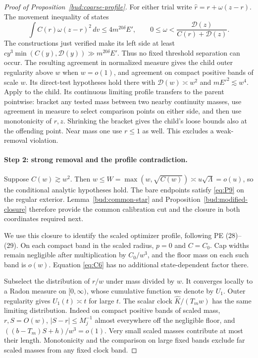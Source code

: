 \begin{proof}[Proof of Proposition~\ref{bud:coarse-profile}]
For either trial write \(\widehat r=r+\omega(z-r)\). The movement
inequality of \cite[Lemma~6.3]{PE} states
\[
 \int C(r)\omega(z-r)^2\,dv\le4m^{20\delta}E',
 \qquad 0\le\omega<\frac{\mathcal D(z)}{C(r)+\mathcal D(z)}.
\]
The constructions just verified make its left side at least
\(c y^3\min(C(y),\mathcal D(y))\gg m^{20\delta}E'\).
Thus no fixed threshold separation can occur. The resulting agreement
in normalized measure gives the child outer regularity above \(w\)
when \(w=o(1)\), and agreement on compact positive bands of scale
\(w\). Its direct-test hypotheses hold there with
\(\mathcal D(w)\asymp w^2\) and \(mE'^2\lesssim w^4\).
Apply \cite[Theorem~5.1 and Proposition~5.9]{PE} to the child.
Its continuous limiting profile transfers to the parent pointwise:
bracket any tested mass between two nearby continuity masses, use
agreement in measure to select comparison points on either side,
and then use monotonicity of \(r,z\). Shrinking the bracket gives
the child's loose bounds also at the offending point. Near mass one
use \(r\le1\) as well. This excludes a weak-removal violation.




\paragraph{Step 2: strong removal and the profile contradiction.}

Suppose $C(w)\gtrsim w^2$. Then
$w\le W=\max(w,\sqrt{C(w)})\asymp u\sqrt\Lambda=o(u)$,
so the conditional analytic hypotheses hold. The bare endpoints satisfy
\eqref{eq:P9} on the regular exterior. Lemma~\ref{bud:common-star} and
Proposition~\ref{bud:modified-closure} therefore provide the common
calibration cut and the closure in both coordinates required next.

We use this closure to identify the scaled optimizer profile,
following PE (28)--(29). On each compact band in the scaled radius,
\(p=0\) and \(C=C_0\). Cap widths remain negligible after
multiplication by \(C_0/w^3\), and the floor mass on each such band
is \(o(w)\). Equation \eqref{eq:C6} has no additional
state-dependent factor there.

Subselect the distribution of \(r/w\) under mass divided by \(w\).
It converges locally to a Radon measure on \([0,\infty)\), whose
cumulative function we denote by \(U_1\). Outer regularity gives
\(U_1(t)\asymp t\) for large \(t\). The scalar clock
\(\widehat K/(T_mw)\) has the same limiting distribution.
Indeed on compact positive bands of scaled mass, \(r,S=O(w)\),
\(|S-r|\le M_j^{-1}\) almost everywhere off the negligible floor,
and \(((b-T_m)S+h)/w^3=o(1)\). Very small scaled masses contribute
at most their length. Monotonicity and the comparison on large fixed
bands exclude far scaled masses from any fixed clock band.


\end{proof}
